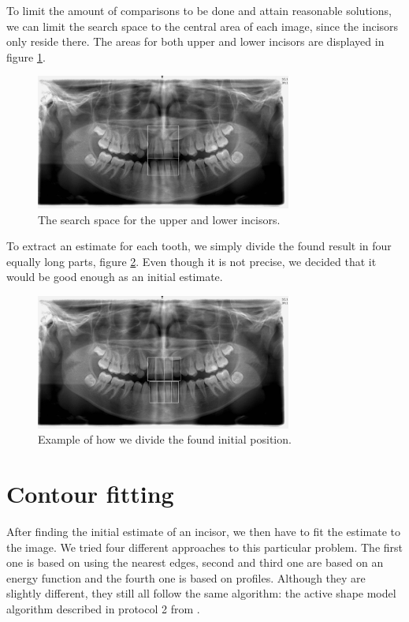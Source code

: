 \documentclass[a4paper,10pt]{article}
\begin{document}
To limit the amount of comparisons to be done and attain reasonable solutions, we can limit the search space to the central area of each image, since the incisors only reside there. The areas for both upper and lower incisors are displayed in figure \ref{fig:PCAsearch}.

\begin{figure}[h!]
  \centering
    \includegraphics[width=0.75\textwidth]{images/searchSpace.jpg}
  \caption{The search space for the upper and lower incisors.}
  \label{fig:PCAsearch}
\end{figure}

To extract an estimate for each tooth, we simply divide the found result in four equally long parts, figure \ref{fig:split4}. Even though it is not precise, we decided that it would be good enough as an initial estimate.

\begin{figure}[h!]
  \centering
    \includegraphics[width=0.75\textwidth]{images/divide.jpg}
  \caption{Example of how we divide the found initial position.}
  \label{fig:split4}
\end{figure}


\section{Contour fitting}\label{sec:fit}
After finding the initial estimate of an incisor, we then have to fit the estimate to the image. We tried four different approaches to this particular problem. The first one is based on using the nearest edges, second and third one are based on an energy function and the fourth one is based on profiles. Although they are slightly different, they still all follow the same algorithm: the active shape model algorithm described in protocol 2 from \cite{TemplateAlgorithm}.
\end{document}
